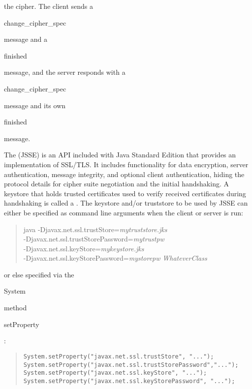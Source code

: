 \begin{description}
  the cipher. The client sends a \begin{code}change\_cipher\_spec\end{code}
  message and a \begin{code}finished\end{code} message, and the server responds with
  a \begin{code}change\_cipher\_spec\end{code} message and its own
  \begin{code}finished\end{code} message.
\end{description}

The  (JSSE) is an API included with Java Standard Edition
that provides an implementation of SSL/TLS.
It includes functionality for data encryption, server authentication, message integrity,
and optional client authentication, hiding the protocol details for cipher suite negotiation
and the initial handshaking.
A keystore that holds trusted certificates used to verify received certificates
during handshaking is called a .
The keystore and/or truststore to be used by JSSE
can either be specified as command line arguments when the client or server is run:
\begin{quote}\begin{code}
java -Djavax.net.ssl.trustStore=\emph{mytruststore.jks} \\
\trind -Djavax.net.ssl.trustStorePassword=\emph{mytrustpw} \\
\trind -Djavax.net.ssl.keyStore=\emph{mykeystore.jks} \\
\trind -Djavax.net.ssl.keyStorePassword=\emph{mystorepw} \emph{WhateverClass}
\end{code}\end{quote}
or else specified via the \begin{code}System\end{code} method \begin{code}setProperty\end{code}:
\begin{quote}\begin{code}\begin{verbatim}
System.setProperty("javax.net.ssl.trustStore", "...");
System.setProperty("javax.net.ssl.trustStorePassword","...");
System.setProperty("javax.net.ssl.keyStore", "...");
System.setProperty("javax.net.ssl.keyStorePassword", "...");
\end{verbatim}\end{code}\end{quote}
